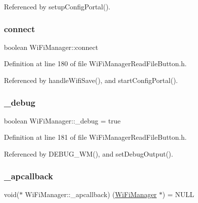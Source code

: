 Referenced by setup\+Config\+Portal().

\mbox{\label{class_wi_fi_manager_a7be7e74e93283eea089af659184dd906}} 
\subsubsection{\texorpdfstring{connect}{connect}}
{\footnotesize\ttfamily boolean Wi\+Fi\+Manager\+::connect\hspace{0.3cm}{\ttfamily [private]}}



Definition at line 180 of file Wi\+Fi\+Manager\+Read\+File\+Button.\+h.



Referenced by handle\+Wifi\+Save(), and start\+Config\+Portal().

\mbox{\label{class_wi_fi_manager_ac0f345f4a4c8bc38a49c8f87931b8cd4}} 
\subsubsection{\texorpdfstring{\+\_\+debug}{\_debug}}
{\footnotesize\ttfamily boolean Wi\+Fi\+Manager\+::\+\_\+debug = true\hspace{0.3cm}{\ttfamily [private]}}



Definition at line 181 of file Wi\+Fi\+Manager\+Read\+File\+Button.\+h.



Referenced by D\+E\+B\+U\+G\+\_\+\+W\+M(), and set\+Debug\+Output().

\mbox{\label{class_wi_fi_manager_ad166247d94aef10a3a8aa34da1351b27}} 
\subsubsection{\texorpdfstring{\+\_\+apcallback}{\_apcallback}}
{\footnotesize\ttfamily void($\ast$ Wi\+Fi\+Manager\+::\+\_\+apcallback) (\hyperlink{class_wi_fi_manager}{Wi\+Fi\+Manager} $\ast$) = N\+U\+LL\hspace{0.3cm}{\ttfamily [private]}}



